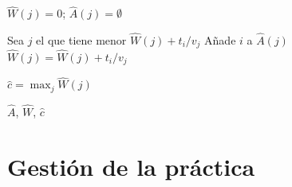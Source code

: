 \documentclass[11pt]{article}
\begin{document}
\begin{algorithm}
\caption{ECCTA$(m, n, t_1, \dots, t_n, v_1, \dots v_m)$}
    \begin{algorithmic}[1]
            \State $\hat{W}(j) = 0$; $\hat{A}(j) = \emptyset$
        \EndFor
        
            \State Sea $j$ el que tiene menor $\hat{W}(j) + t_i/v_j$
            \State Añade $i$ a $\hat{A}(j)$
            \State $\hat{W}(j) = \hat{W}(j) + t_i/v_j$
        \EndFor
        
        \State $\hat{c} = \max_{j} \hat{W}(j)$
        
        \State \Return $\hat{A}$, $\hat{W}$, $\hat{c}$
    \end{algorithmic}
\end{algorithm}

\newpage

\thispagestyle{empty}
\nocite{*}
\printbibliography

\newpage

\appendix

\section{Gestión de la práctica}
\end{document}
